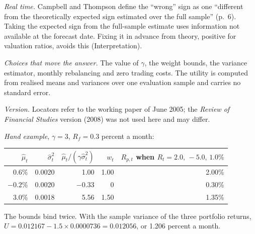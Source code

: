 \begin{qfmethod}
 \emph{Real time.} Campbell and Thompson define the ``wrong'' sign as one ``different from the theoretically expected sign estimated over the full sample'' (p.~6). Taking the expected sign from the full-sample estimate uses information not available at the forecast date. Fixing it in advance from theory, positive for valuation ratios, avoids this (Interpretation).

\emph{Choices that move the answer.} The value of $\gamma$, the weight bounds, the variance estimator, monthly rebalancing and zero trading costs. The utility is computed from realised means and variances over one evaluation sample and carries no standard error.

\emph{Version.} Locators refer to the working paper of June 2005; the \emph{Review of Financial Studies} version (2008) was not used here and may differ.

 \emph{Hand example}, $\gamma=3$, $R_f=0.3$ percent a month:
\begin{center}\small
\begin{tabular}{@{}rrrrr@{}}
\toprule
$\hat\mu_t$ & $\hat\sigma_t^2$ & $\hat\mu_t/(\gamma\hat\sigma_t^2)$ & $w_t$ & $R_{p,t}$ when $R_t=2.0,\,-5.0,\,1.0\%$ \\
\midrule
0.6\% & 0.0020 & 1.00 & 1.00 & 2.00\% \\
$-0.2$\% & 0.0020 & $-0.33$ & 0 & 0.30\% \\
3.0\% & 0.0018 & 5.56 & 1.50 & 1.35\% \\
\bottomrule
\end{tabular}
\end{center}
The bounds bind twice. With the sample variance of the three portfolio returns, $U=0.012167-1.5\times0.0000736=0.012056$, or 1.206 percent a month.


\end{qfmethod}
